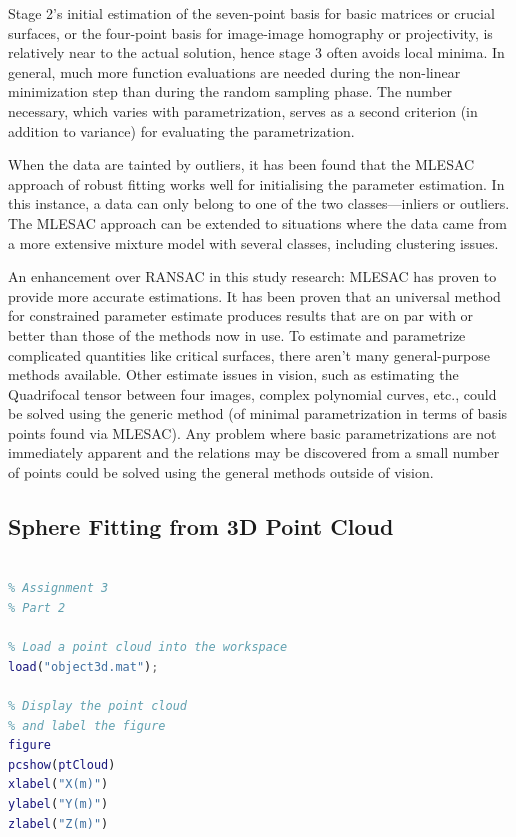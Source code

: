 \documentclass[conference]{IEEEtran}
\begin{document}
Stage 2's initial estimation of the seven-point basis for basic matrices or crucial surfaces, or the four-point basis for image-image homography or projectivity, is relatively near to the actual solution, hence stage 3 often avoids local minima. In general, much more function evaluations are needed during the non-linear minimization step than during the random sampling phase. The number necessary, which varies with parametrization, serves as a second criterion (in addition to variance) for evaluating the parametrization.

When the data are tainted by outliers, it has been found that the MLESAC approach of robust fitting works well for initialising the parameter estimation. In this instance, a data can only belong to one of the two classes—inliers or outliers. The MLESAC approach can be extended to situations where the data came from a more extensive mixture model with several classes, including clustering issues.

An enhancement over RANSAC in this study research: MLESAC has proven to provide more accurate estimations. It has been proven that an universal method for constrained parameter estimate produces results that are on par with or better than those of the methods now in use. To estimate and parametrize complicated quantities like critical surfaces, there aren't many general-purpose methods available. Other estimate issues in vision, such as estimating the Quadrifocal tensor between four images, complex polynomial curves, etc., could be solved using the generic method (of minimal parametrization in terms of basis points found via MLESAC). Any problem where basic parametrizations are not immediately apparent and the relations may be discovered from a small number of points could be solved using the general methods outside of vision.

\clearpage

\subsection{Sphere Fitting from 3D Point Cloud}

\begin{lstlisting}[language=Matlab]

% Assignment 3
% Part 2

% Load a point cloud into the workspace
load("object3d.mat");

% Display the point cloud 
% and label the figure
figure
pcshow(ptCloud)
xlabel("X(m)")
ylabel("Y(m)")
zlabel("Z(m)")

\end{lstlisting}
\end{document}
